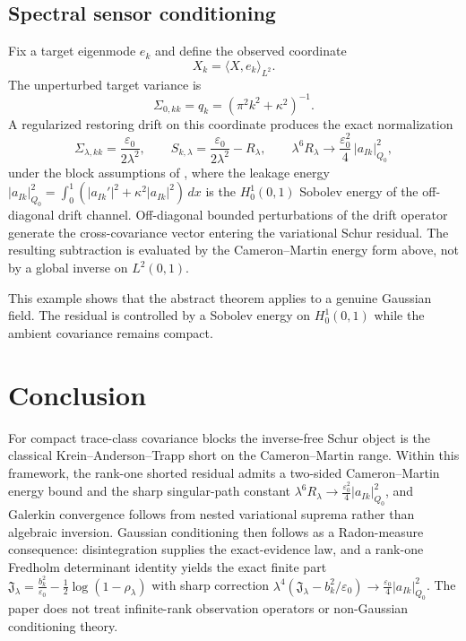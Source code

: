 \documentclass[preprint,12pt]{elsarticle}
\theoremstyle{plain}
\theoremstyle{definition}
\theoremstyle{remark}
\begin{document}
    \subsection{Spectral sensor conditioning}

    Fix a target eigenmode $e_k$ and define the observed coordinate
    \[
    X_k=\langle X,e_k\rangle_{L^2}.
    \]
    The unperturbed target variance is
    \[
    \Sigma_{0,kk}=q_k=(\pi^2k^2+\kappa^2)^{-1}.
    \]
    A regularized restoring drift on this coordinate produces the exact normalization
    \[
    \Sigma_{\lambda,kk}=\frac{\varepsilon_0}{2\lambda^2},
    \qquad
    S_{k,\lambda}=\frac{\varepsilon_0}{2\lambda^2}-R_\lambda,
    \qquad
    \lambda^6R_\lambda\to\frac{\varepsilon_0^2}{4}\,|a_{Ik}|_{Q_0}^2,
    \]
    under the block assumptions of , where the leakage energy
    $|a_{Ik}|_{Q_0}^2=\int_0^1(|a_{Ik}'|^2+\kappa^2|a_{Ik}|^2)\,dx$ is the
    $H_0^1(0,1)$ Sobolev energy of the off-diagonal drift channel. Off-diagonal bounded perturbations of the drift operator generate the cross-covariance vector entering the variational Schur residual. The resulting subtraction is evaluated by the Cameron--Martin energy form above, not by a global inverse on $L^2(0,1)$.

    This example shows that the abstract theorem applies to a genuine Gaussian field. The residual is controlled by a Sobolev energy on $H_0^1(0,1)$ while the ambient covariance remains compact.

    \section{Conclusion}
    \label{sec:conclusion}

    For compact trace-class covariance blocks the inverse-free Schur object is
    the classical Krein--Anderson--Trapp short on the Cameron--Martin range.
    Within this framework, the rank-one shorted residual admits a two-sided
    Cameron--Martin energy bound and the sharp singular-path constant
    $\lambda^6R_\lambda\to\frac{\varepsilon_0^2}{4}|a_{Ik}|_{Q_0}^2$, and Galerkin
    convergence follows from nested variational suprema rather than algebraic
    inversion.  Gaussian conditioning then follows as a Radon-measure
    consequence: disintegration supplies the exact-evidence law, and a rank-one
    Fredholm determinant identity yields the exact finite part
    $\mathfrak{J}_\lambda=\frac{b_k^2}{\varepsilon_0}-\frac12\log(1-\rho_\lambda)$
    with sharp correction
    $\lambda^4(\mathfrak{J}_\lambda-b_k^2/\varepsilon_0)\to\frac{\varepsilon_0}{4}|a_{Ik}|_{Q_0}^2$.
    The paper does not treat infinite-rank observation operators or non-Gaussian
    conditioning theory.
\end{document}
